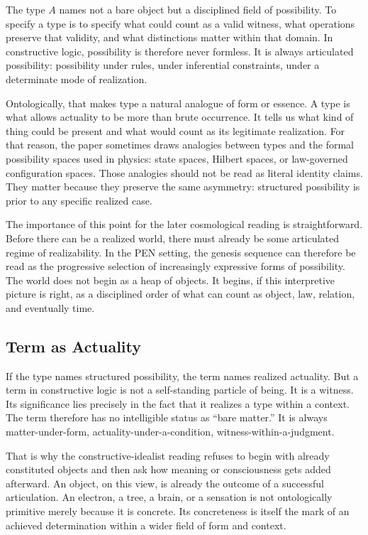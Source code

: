 \documentclass[11pt,a4paper]{article}
\theoremstyle{plain}
\theoremstyle{definition}
\theoremstyle{remark}
\begin{document}
The type $A$ names not a bare object but a disciplined field of possibility.
To specify a type is to specify what could count as a valid witness, what operations preserve that validity, and what distinctions matter within that domain.
In constructive logic, possibility is therefore never formless.
It is always articulated possibility: possibility under rules, under inferential constraints, under a determinate mode of realization.

Ontologically, that makes type a natural analogue of form or essence.
A type is what allows actuality to be more than brute occurrence.
It tells us what kind of thing could be present and what would count as its legitimate realization.
For that reason, the paper sometimes draws analogies between types and the formal possibility spaces used in physics: state spaces, Hilbert spaces, or law-governed configuration spaces.
Those analogies should not be read as literal identity claims.
They matter because they preserve the same asymmetry: structured possibility is prior to any specific realized case.

The importance of this point for the later cosmological reading is straightforward.
Before there can be a realized world, there must already be some articulated regime of realizability.
In the PEN setting, the genesis sequence can therefore be read as the progressive selection of increasingly expressive forms of possibility.
The world does not begin as a heap of objects.
It begins, if this interpretive picture is right, as a disciplined order of what can count as object, law, relation, and eventually time.

\subsection{Term as Actuality}
\label{subsec:term}

If the type names structured possibility, the term names realized actuality.
But a term in constructive logic is not a self-standing particle of being.
It is a witness.
Its significance lies precisely in the fact that it realizes a type within a context.
The term therefore has no intelligible status as ``bare matter.''
It is always matter-under-form, actuality-under-a-condition, witness-within-a-judgment.

That is why the constructive-idealist reading refuses to begin with already constituted objects and then ask how meaning or consciousness gets added afterward.
An object, on this view, is already the outcome of a successful articulation.
An electron, a tree, a brain, or a sensation is not ontologically primitive merely because it is concrete.
Its concreteness is itself the mark of an achieved determination within a wider field of form and context.
\end{document}
